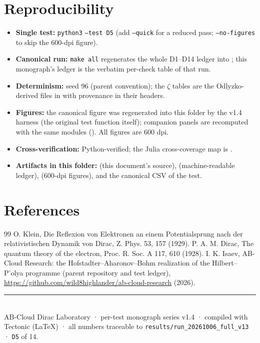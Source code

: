 \documentclass[11pt,a4paper]{article}
\begin{document}
\section{Reproducibility}
\begin{itemize}[leftmargin=1.2em, itemsep=0.15em]
\item \textbf{Single test:} \texttt{python3}  \texttt{--test D5} (add \texttt{--quick} for a reduced pass; \texttt{--no-figures} to skip the 600-dpi figure).
\item \textbf{Canonical run:} \texttt{make all} regenerates the whole D1--D14 ledger into ; this monograph's ledger is the verbatim per-check table of that run.
\item \textbf{Determinism:} seed 96 (parent convention); the $\zeta$ tables are the Odlyzko-derived files in  with provenance in their headers.
\item \textbf{Figures:} the canonical figure was regenerated into this folder by the v1.4 harness (the original test function itself); companion panels are recomputed with the same modules (). All figures are 600 dpi.
\item \textbf{Cross-verification:} Python-verified; the Julia cross-coverage map is .
\item \textbf{Artifacts in this folder:}  (this document's source),  (machine-readable ledger),  (600-dpi figures), and the canonical CSV of the test.
\end{itemize}

\section*{References}
\begin{thebibliography}{99}\small
{} O. Klein, Die Reflexion von Elektronen an einem Potentialsprung nach der relativistischen Dynamik von Dirac, Z. Phys. 53, 157 (1929).
 P. A. M. Dirac, The quantum theory of the electron, Proc. R. Soc. A 117, 610 (1928).
 I. K. Isaev, AB-Cloud Research: the Hofstadter--Aharonov--Bohm realization of the Hilbert--P'olya programme (parent repository and test ledger), \url{https://github.com/wild8highlander/ab-cloud-research} (2026).
\end{thebibliography}

\vfill
\noindent\rule{\textwidth}{0.4pt}\\[0.2em]
{\footnotesize\color{labgray} AB-Cloud Dirac Laboratory · per-test monograph series v1.4 · compiled with Tectonic (LaTeX) · all numbers traceable to \texttt{results/run\_20261006\_full\_v13} · \texttt{D5} of 14.}
\end{document}
